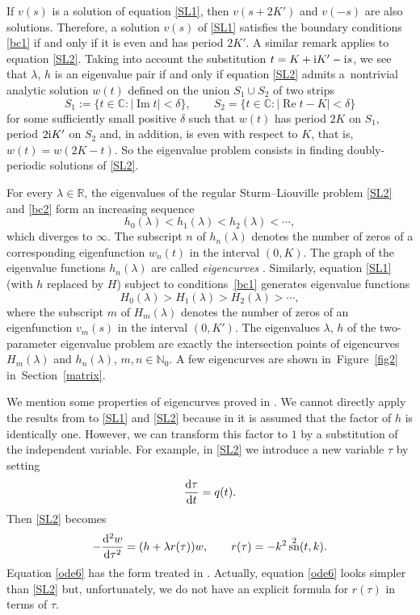 \documentclass[pdftex]{sigma}
\newcommand{\R}{\mathbb{R}}
\newcommand{\C}{\mathbb{C}}
\newcommand{\N}{\mathbb{N}}
\DeclareMathOperator{\sn}{sn}
\numberwithin{equation}{section}
\begin{document}
If $v(s)$ is a solution of equation \eqref{SL1}, then $v(s+2K')$ and $v(-s)$ are also solutions.
Therefore, a solution $v(s)$ of \eqref{SL1} satisfies the boundary conditions \eqref{bc1} if and only if
it is even and has period $2K'$. A similar remark applies to equation \eqref{SL2}.
Taking into account the substitution $t=K+{\rm i}K'-{\rm i}s$, we see that $\lambda$, $h$ is an eigenvalue pair if and only if equation \eqref{SL2}
admits a~nontrivial analytic solution $w(t)$ defined on the union $S_1\cup S_2$ of two strips
\[ S_1:=\{t\in\C\colon |{\operatorname{Im}  t}|<\delta\},\qquad S_2=\{t\in\C\colon |{\operatorname{Re}  t-K}|<\delta\}\]
for some sufficiently small positive $\delta$ such that $w(t)$ has period $2K$ on $S_1$, period $2{\rm i}K'$ on $S_2$ and, in addition, is even with respect to $K$, that is, $w(t)=w(2K-t)$. So the eigenvalue problem consists in finding
doubly-periodic solutions of \eqref{SL2}.

For every $\lambda\in\R$, the eigenvalues of the regular Sturm--Liouville problem \eqref{SL2} and \eqref{bc2}
form an increasing sequence
\[ h_0(\lambda)<h_1(\lambda)<h_2(\lambda)<\cdots ,\]
which diverges to $\infty$.
The subscript $n$ of $h_n(\lambda)$ denotes the number of zeros of a corresponding eigenfunction $w_n(t)$ in the interval $(0,K)$.
The graph of the eigenvalue functions $h_n(\lambda)$ are called {\it eigencurves} \cite[Section~6]{AM}.
Similarly, equation \eqref{SL1} (with $h$ replaced by $H$) subject to conditions~\eqref{bc1}
generates eigenvalue functions
\[ H_0(\lambda)>H_1(\lambda)>H_2(\lambda)>\cdots,\]
where the subscript $m$ of $H_m(\lambda)$ denotes the number of zeros of an eigenfunction $v_m(s)$ in the interval $(0,K')$.
The eigenvalues $\lambda$, $h$ of the two-parameter eigenvalue problem are exactly the intersection points of
eigencurves $H_m(\lambda)$ and $h_n(\lambda)$, $m,n\in\N_0$.
A few eigencurves are shown in~Figure~\ref{fig2} in~Section~\ref{matrix}.

We mention some properties of eigencurves proved in \cite{BV}.
We cannot directly apply the results from \cite{BV} to \eqref{SL1} and \eqref{SL2}
because in \cite{BV} it is assumed that the factor of $h$ is identically one. However, we can transform
this factor to $1$ by a substitution of the independent variable. For example, in \eqref{SL2} we
introduce a new variable $\tau$ by setting
\[ \frac{{\rm d}\tau}{{\rm d}t}=q(t) .\]
Then \eqref{SL2} becomes
\begin{equation}\label{ode6}
 -\frac{{\rm d}^2w}{{\rm d}\tau^2}=(h+\lambda r(\tau)) w,\qquad r(\tau)=-k^2\sn^2(t,k).
 \end{equation}
Equation \eqref{ode6} has the form treated in \cite{BV}. Actually, equation \eqref{ode6} looks simpler than \eqref{SL2}
but, unfortunately, we do not have an explicit formula for $r(\tau)$ in terms of $\tau$.
\end{document}
